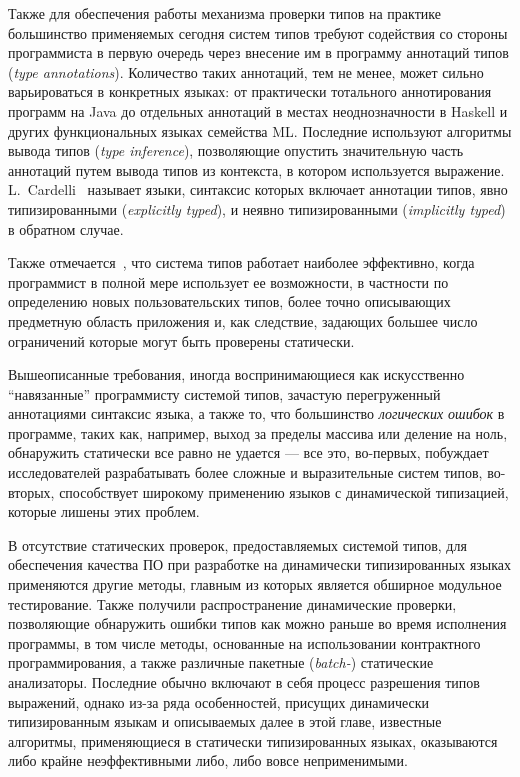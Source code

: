 Также для обеспечения работы механизма проверки типов на практике большинство
применяемых сегодня систем типов требуют содействия со стороны программиста в
первую очередь через внесение им в программу аннотаций типов (\emph{type
  annotations}). Количество таких аннотаций, тем не менее, может сильно
варьироваться в конкретных языках: от практически тотального аннотирования
программ на Java до отдельных аннотаций в местах неоднозначности в Haskell и
других функциональных языках семейства ML. Последние используют алгоритмы вывода
типов (\emph{type inference}), позволяющие опустить значительную часть аннотаций
путем вывода типов из контекста, в котором используется выражение.  
L.~Cardelli~\cite{Cardelli2004} называет языки, синтаксис которых включает
аннотации типов, явно типизированными (\emph{explicitly typed}), и неявно
типизированными (\emph{implicitly typed}) в обратном случае.

Также отмечается~\cite{Pierce2002}, что система типов работает наиболее
эффективно, когда программист в полной мере использует ее возможности, в
частности по определению новых пользовательских типов, более точно описывающих
предметную область приложения и, как следствие, задающих большее число ограничений
которые могут быть проверены статически.


Вышеописанные требования, иногда воспринимающиеся как искусственно ``навязанные''
программисту системой типов, зачастую перегруженный аннотациями синтаксис языка,
а также то, что большинство \emph{логических ошибок} в программе, таких как, например,
выход за пределы массива или деление на ноль, обнаружить статически все равно не
удается --- все это, во-первых, побуждает исследователей разрабатывать более
сложные и выразительные систем типов, во-вторых, способствует широкому
применению языков с динамической типизацией, которые лишены этих проблем.

В отсутствие статических проверок, предоставляемых системой типов, для
обеспечения качества ПО при разработке на динамически типизированных языках
применяются другие методы, главным из которых является обширное модульное
тестирование. Также получили распространение динамические проверки, позволяющие
обнаружить ошибки типов как можно раньше во время исполнения программы, в том
числе методы, основанные на использовании контрактного программирования, а также
различные пакетные (\emph{batch-}) статические анализаторы. Последние обычно
включают в себя процесс разрешения типов выражений, однако из-за ряда
особенностей, присущих динамически типизированным языкам и описываемых далее в
этой главе, известные алгоритмы, применяющиеся в статически типизированных
языках, оказываются либо крайне неэффективными либо, либо вовсе неприменимыми.

